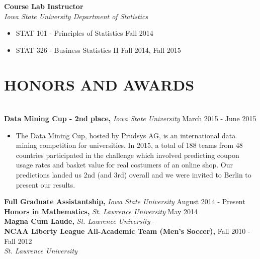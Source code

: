 \documentclass{res} %
\begin{document}
\begin{resume}
{\bf Course Lab Instructor} \\
{\sl Iowa State University Department of Statistics}
\begin{itemize} \itemsep -2pt 
\item STAT 101 - Principles of Statistics \hfill Fall 2014
\item STAT 326 - Business Statistics II \hfill Fall 2014, Fall 2015
\end{itemize}



%


\section{HONORS AND AWARDS}

\hrulefill \\
{\bf Data Mining Cup - 2nd place,} {\sl Iowa State University} \dotfill March 2015 -
June 2015 
\begin{itemize} \itemsep -2pt
  \item The Data Mining Cup, hosted by Prudsys AG, is an international data
    mining competition for universities. In 2015, a total of 188 teams from 48
    countries participated in the challenge which involved predicting coupon
    usage rates and basket value for real costumers of an online shop. Our
    predictions landed us 2nd (and 3rd) overall and we were invited to Berlin to
    present our results.
\end{itemize}
\vspace{-1em}
{\bf Full Graduate Assistantship,} {\sl Iowa State University} \dotfill August 2014 - Present \\
{\bf Honors in Mathematics,} {\sl St. Lawrence University} \dotfill May 2014 \\
{\bf Magna Cum Laude,} {\sl St. Lawrence University} \hfill - \\
{\bf NCAA Liberty League All-Academic Team (Men's Soccer),} \dotfill Fall 2010 -
Fall 2012 \\
{\sl St. Lawrence University} 


\end{resume}
\end{document}
